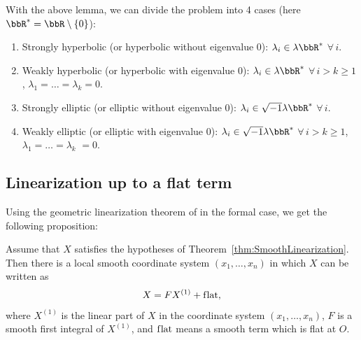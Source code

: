 With the above lemma, we can divide the problem into 4 cases (here $\bbR^* = \bbR \setminus \{0\}$):
\begin{enumerate}\itemsep=0pt
\item[I.] Strongly hyperbolic (or hyperbolic without eigenvalue 0): $\lambda_i \in \lambda\bbR^*$ $\forall\, i$.
\item[II.] Weakly hyperbolic (or hyperbolic with eigenvalue 0): $\lambda_i \in \lambda\bbR^* $ $\forall\, i > k \geq 1$,
$\lambda_1 = \dots = \lambda_k = 0$.
\item[III.] Strongly elliptic (or elliptic without eigenvalue 0): $\lambda_i \in \sqrt{-1}\lambda\bbR^*$ $\forall\, i$.
\item[IV.] Weakly elliptic (or elliptic with eigenvalue 0): $\lambda_i \in \sqrt{-1}\lambda\bbR^*$ $\forall\, i > k \geq 1$,
$\lambda_1 = \dots = \lambda_k$ $= 0$.
\end{enumerate}

\subsection{Linearization up to a f\/lat term} Using the geometric linearization theorem of \cite{Zung-Nondegenerate2015}
in the formal case, we get the following proposition:

\begin{prop} \label{prop:LinearizationUpToFlat}
 Assume that $X$ satisfies the hypotheses of Theorem~{\rm \ref{thm:SmoothLinearization}}. Then there is a local smooth
coordinate system $(x_1,\dots,x_n)$ in which $X$ can be written as
\begin{gather*}
X = FX^{(1)} + \text{\rm f\/lat},
\end{gather*}
where $X^{(1)}$ is the linear part of $X$ in the coordinate system $(x_1,\dots,x_n)$,
$F$ is a smooth first integral of $X^{(1)}$, and $\text{\rm f\/lat}$ means a smooth term which is flat at $O$.
\end{prop}

